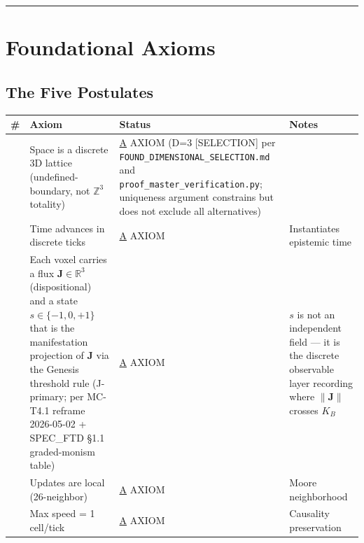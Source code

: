 \documentclass[
  11pt,
  letterpaper,
  twoside,
  openany]{book}
\makeatletter
\let\orig@section\section
\renewcommand{\section}{\needspace{8\baselineskip}\orig@section}
\let\orig@subsection\subsection
\renewcommand{\subsection}{\needspace{6\baselineskip}\orig@subsection}
\makeatother
\begin{document}
\begin{center}\rule{0.5\linewidth}{0.5pt}\end{center}

\section{Foundational Axioms}\label{foundational-axioms}

\subsection{The Five Postulates}\label{the-five-postulates-1}

\begin{longtable}[]{@{}
  >{\raggedright\arraybackslash}p{}
  >{\raggedright\arraybackslash}p{}
  >{\raggedright\arraybackslash}p{}
  >{\raggedright\arraybackslash}p{}@{}}
\toprule\noalign{}
\begin{minipage}[b]{\linewidth}\raggedright
\#
\end{minipage} & \begin{minipage}[b]{\linewidth}\raggedright
Axiom
\end{minipage} & \begin{minipage}[b]{\linewidth}\raggedright
Status
\end{minipage} & \begin{minipage}[b]{\linewidth}\raggedright
Notes
\end{minipage} \\
\midrule\noalign{}
\endhead
\bottomrule\noalign{}
\endlastfoot
1 & Space is a discrete 3D lattice (undefined-boundary, not
\(\mathbb{Z}^3\) totality) & \hyperref[a]{A} AXIOM (D=3 {[}SELECTION{]}
per \texttt{FOUND\_DIMENSIONAL\_SELECTION.md} and
\texttt{proof\_master\_verification.py}; uniqueness argument constrains
but does not exclude all alternatives) & \\
2 & Time advances in discrete ticks & \hyperref[a]{A} AXIOM &
Instantiates epistemic time \\
3 & Each voxel carries a flux \(\mathbf{J} \in \mathbb{R}^3\)
(dispositional) and a state \(s \in \{-1,0,+1\}\) that is the
manifestation projection of \(\mathbf{J}\) via the Genesis threshold
rule (J-primary; per MC-T4.1 reframe 2026-05-02 + SPEC\_FTD §1.1
graded-monism table) & \hyperref[a]{A} AXIOM & \(s\) is not an
independent field --- it is the discrete observable layer recording
where \(\|\mathbf{J}\|\) crosses \(K_B\) \\
4 & Updates are local (26-neighbor) & \hyperref[a]{A} AXIOM & Moore
neighborhood \\
5 & Max speed = 1 cell/tick & \hyperref[a]{A} AXIOM & Causality
preservation \\
\end{longtable}
\end{document}
